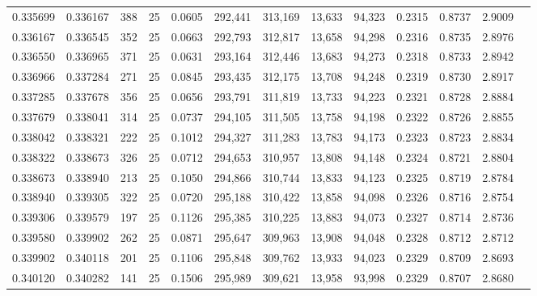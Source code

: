 \begin{tabular}{rrrrrrrrrrrrr}
0.335699 & 0.336167 &   388 &  25 &                                     0.0605 & 292,441 & 313,169 &  13,633 &  94,323 & 0.2315 & 0.8737 & 2.9009 \\
0.336167 & 0.336545 &   352 &  25 &                                     0.0663 & 292,793 & 312,817 &  13,658 &  94,298 & 0.2316 & 0.8735 & 2.8976 \\
0.336550 & 0.336965 &   371 &  25 &                                     0.0631 & 293,164 & 312,446 &  13,683 &  94,273 & 0.2318 & 0.8733 & 2.8942 \\
0.336966 & 0.337284 &   271 &  25 &                                     0.0845 & 293,435 & 312,175 &  13,708 &  94,248 & 0.2319 & 0.8730 & 2.8917 \\
0.337285 & 0.337678 &   356 &  25 &                                     0.0656 & 293,791 & 311,819 &  13,733 &  94,223 & 0.2321 & 0.8728 & 2.8884 \\
0.337679 & 0.338041 &   314 &  25 &                                     0.0737 & 294,105 & 311,505 &  13,758 &  94,198 & 0.2322 & 0.8726 & 2.8855 \\
0.338042 & 0.338321 &   222 &  25 &                                     0.1012 & 294,327 & 311,283 &  13,783 &  94,173 & 0.2323 & 0.8723 & 2.8834 \\
0.338322 & 0.338673 &   326 &  25 &                                     0.0712 & 294,653 & 310,957 &  13,808 &  94,148 & 0.2324 & 0.8721 & 2.8804 \\
0.338673 & 0.338940 &   213 &  25 &                                     0.1050 & 294,866 & 310,744 &  13,833 &  94,123 & 0.2325 & 0.8719 & 2.8784 \\
0.338940 & 0.339305 &   322 &  25 &                                     0.0720 & 295,188 & 310,422 &  13,858 &  94,098 & 0.2326 & 0.8716 & 2.8754 \\
0.339306 & 0.339579 &   197 &  25 &                                     0.1126 & 295,385 & 310,225 &  13,883 &  94,073 & 0.2327 & 0.8714 & 2.8736 \\
0.339580 & 0.339902 &   262 &  25 &                                     0.0871 & 295,647 & 309,963 &  13,908 &  94,048 & 0.2328 & 0.8712 & 2.8712 \\
0.339902 & 0.340118 &   201 &  25 &                                     0.1106 & 295,848 & 309,762 &  13,933 &  94,023 & 0.2329 & 0.8709 & 2.8693 \\
0.340120 & 0.340282 &   141 &  25 &                                     0.1506 & 295,989 & 309,621 &  13,958 &  93,998 & 0.2329 & 0.8707 & 2.8680 \\

\end{tabular}

